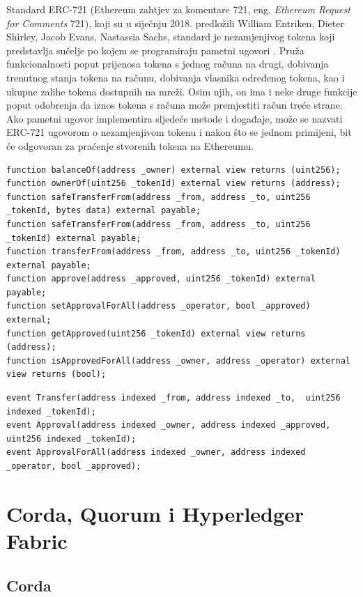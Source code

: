 \documentclass[times, utf8, diplomski]{fer}
\begin{document}
Standard ERC-721 (Ethereum zahtjev za komentare 721, eng. \textit{Ethereum Request for Comments} 721), koji su u siječnju 2018. predložili William Entriken, Dieter Shirley, Jacob Evans, Nastassia Sachs, standard je nezamjenjivog tokena koji predstavlja sučelje po kojem se programiraju pametni ugovori \cite{erc721}. Pruža funkcionalnosti poput prijenosa tokena s jednog računa na drugi, dobivanja trenutnog stanja tokena na računu, dobivanja vlasnika određenog tokena, kao i ukupne zalihe tokena dostupnih na mreži. Osim njih, on ima i neke druge funkcije poput odobrenja da iznos tokena s računa može premjestiti račun treće strane.
Ako pametni ugovor implementira sljedeće metode i događaje, može se nazvati ERC-721 ugovorom o nezamjenjivom tokenu i nakon što se jednom primijeni, bit će odgovoran za praćenje stvorenih tokena na Ethereumu.

\begin{lstlisting}
function balanceOf(address _owner) external view returns (uint256);
function ownerOf(uint256 _tokenId) external view returns (address);
function safeTransferFrom(address _from, address _to, uint256 _tokenId, bytes data) external payable;
function safeTransferFrom(address _from, address _to, uint256 _tokenId) external payable;
function transferFrom(address _from, address _to, uint256 _tokenId) external payable;
function approve(address _approved, uint256 _tokenId) external payable;
function setApprovalForAll(address _operator, bool _approved) external;
function getApproved(uint256 _tokenId) external view returns (address);
function isApprovedForAll(address _owner, address _operator) external view returns (bool);
\end{lstlisting}
\begin{lstlisting}
event Transfer(address indexed _from, address indexed _to,  uint256 indexed _tokenId);
event Approval(address indexed _owner, address indexed _approved,  uint256 indexed _tokenId);
event ApprovalForAll(address indexed _owner, address indexed _operator, bool _approved);
\end{lstlisting}

\section{Corda, Quorum i Hyperledger Fabric}

\subsection{Corda}
\end{document}
